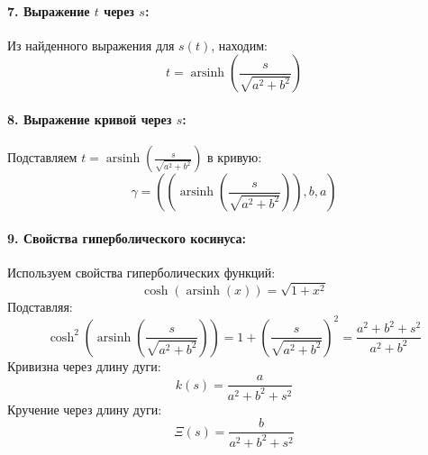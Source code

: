 \documentclass{article}
\begin{document}
        \paragraph{7. Выражение \(t\) через \(s\):}
        Из найденного выражения для \(s(t)\), находим:
        \[
        t = \operatorname{arsinh}\left(\frac{s}{\sqrt{a^2 + b^2}}\right)
        \]
        
        \paragraph{8. Выражение кривой через \(s\):}
        Подставляем \(t = \operatorname{arsinh}\left(\frac{s}{\sqrt{a^2 + b^2}}\right)\) в кривую:
        \[
        \gamma = \left(\left(\operatorname{arsinh}\left(\frac{s}{\sqrt{a^2 + b^2}}\right)\right), b, a\right)
        \]
        
        \paragraph{9. Свойства гиперболического косинуса:}
        Используем свойства гиперболических функций:
        \[
        \cosh(\operatorname{arsinh}(x)) = \sqrt{1 + x^2}
        \]
        Подставляя:
        \[
        \cosh^2\left(\operatorname{arsinh}\left(\frac{s}{\sqrt{a^2 + b^2}}\right)\right) = 1 + \left(\frac{s}{\sqrt{a^2 + b^2}}\right)^2 = \frac{a^2 + b^2 + s^2}{a^2 + b^2}
        \]
        Кривизна через длину дуги:
        \[
        k(s) = \frac{a}{a^2 + b^2 + s^2}
        \]
        Кручение через длину дуги:
        \[
        \Xi(s) = \frac{b}{a^2 + b^2 + s^2}
        \]
        
    
\end{document}
